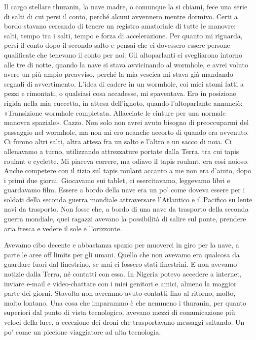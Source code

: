 Il cargo stellare thuranin, la nave madre, o comunque la si chiami, fece
una serie di salti di cui persi il conto, perché alcuni avvennero mentre
dormivo. Certi a bordo stavano cercando di tenere un registro amatoriale
di tutte le manovre: salti, tempo tra i salti, tempo e forza di
accelerazione. Per quanto mi riguarda, persi il conto dopo il secondo
salto e pensai che ci dovessero essere persone qualificate che tenevano
il conto per noi. Gli altoparlanti ci svegliarono intorno alle tre di
notte, quando la nave si stava avvicinando al wormhole, e avrei voluto
avere un più ampio preavviso, perché la mia vescica mi stava già
mandando segnali di avvertimento. L'idea di cadere in un wormhole, coi
miei atomi fatti a pezzi e rimontati, o qualsiasi cosa accadesse, mi
spaventava. Ero in posizione rigida nella mia cuccetta, in attesa
dell'ignoto, quando l'altoparlante annunciò: «Transizione wormhole
completata. Allacciate le cinture per una normale manovra spaziale».
Cazzo. Non solo non avrei avuto bisogno di preoccuparmi del passaggio
nel wormhole, ma non mi ero neanche accorto di quando era avvenuto. Ci
furono altri salti, altra attesa fra un salto e l'altro e un sacco di
noia. Ci allenavamo a turno, utilizzando attrezzature portate dalla
Terra, tra cui tapis roulant e cyclette. Mi piaceva correre, ma odiavo
il tapis roulant, era così noioso. Anche competere con il tizio sul
tapis roulant accanto a me non era d'aiuto, dopo i primi due giorni.
Giocavamo sui tablet, ci esercitavamo, leggevamo libri e guardavamo
film. Essere a bordo della nave era un po' come doveva essere per i
soldati della seconda guerra mondiale attraversare l'Atlantico e il
Pacifico su lente navi da trasporto. Non fosse che, a bordo di una nave
da trasporto della seconda guerra mondiale, quei ragazzi avevano la
possibilità di salire sul ponte, prendere aria fresca e vedere il sole e
l'orizzonte.

Avevamo cibo decente e abbastanza spazio per muoverci in giro per la
nave, a parte le aree off limits per gli umani. Quello che non avevamo
era qualcosa da guardare fuori dal finestrino, se mai ci fossero stati
finestrini. E non avevamo notizie dalla Terra, né contatti con essa. In
Nigeria potevo accedere a internet, inviare e-mail e video-chattare con
i miei genitori e amici, almeno la maggior parte dei giorni. Stavolta
non avremmo avuto contatti fino al ritorno, molto, molto lontano. Una
cosa che imparammo è che nemmeno i thuranin, per quanto superiori dal
punto di vista tecnologico, avevano mezzi di comunicazione più veloci
della luce, a eccezione dei droni che trasportavano messaggi saltando.
Un po' come un piccione viaggiatore ad alta tecnologia.


